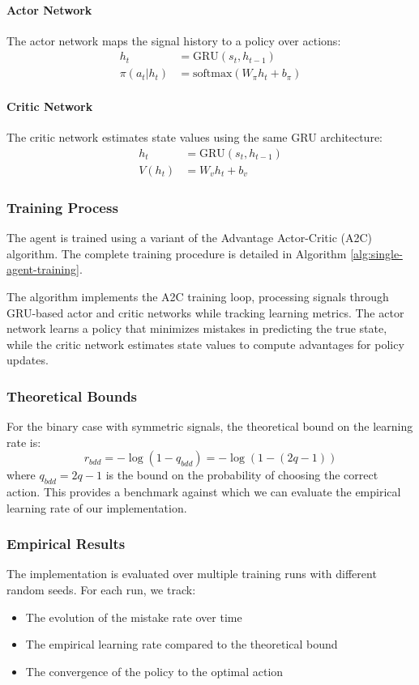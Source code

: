 \paragraph{Actor Network}
The actor network maps the signal history to a policy over actions:
\begin{align*}
    h_t &= \text{GRU}(s_t, h_{t-1}) \\
    \pi(a_t|h_t) &= \text{softmax}(W_\pi h_t + b_\pi)
\end{align*}

\paragraph{Critic Network}
The critic network estimates state values using the same GRU architecture:
\begin{align*}
    h_t &= \text{GRU}(s_t, h_{t-1}) \\
    V(h_t) &= W_v h_t + b_v
\end{align*}

\subsubsection*{Training Process}
The agent is trained using a variant of the Advantage Actor-Critic (A2C) algorithm. The complete training procedure is detailed in Algorithm \ref{alg:single-agent-training}.
   
The algorithm implements the A2C training loop, processing signals through GRU-based actor and critic networks while tracking learning metrics. The actor network learns a policy that minimizes mistakes in predicting the true state, while the critic network estimates state values to compute advantages for policy updates.

\subsubsection*{Theoretical Bounds}
For the binary case with symmetric signals, the theoretical bound on the learning rate is:
\[
    r_{bdd} = -\log(1-q_{bdd}) = -\log(1-(2q-1))
\]
where $q_{bdd} = 2q-1$ is the bound on the probability of choosing the correct action. This provides a benchmark against which we can evaluate the empirical learning rate of our implementation.

\subsubsection*{Empirical Results}
The implementation is evaluated over multiple training runs with different random seeds. For each run, we track:
\begin{itemize}
    \item The evolution of the mistake rate over time
    \item The empirical learning rate compared to the theoretical bound
    \item The convergence of the policy to the optimal action
\end{itemize}